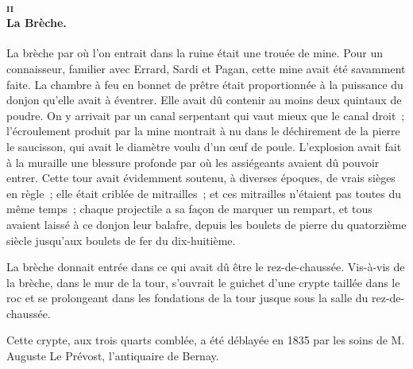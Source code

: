 \documentclass[french,twoside]{book} %
\begin{document}
\paragraph[{ii La Brèche.}]{\textsc{ii} \\
La Brèche.}
\label{p3l2c9p2}
\noindent La brèche par où l’on entrait dans la ruine était une trouée de mine. Pour un connaisseur, familier avec Errard, Sardi et Pagan, cette mine avait été savamment faite. La chambre à feu en bonnet de prêtre était proportionnée à la puissance du donjon qu’elle avait à éventrer. Elle avait dû contenir au moins deux quintaux de poudre. On y arrivait par un canal serpentant qui vaut mieux que le canal droit ; l’écroulement produit par la mine montrait à nu dans le déchirement de la pierre le saucisson, qui avait le diamètre voulu d’un œuf de poule. L’explosion avait fait à la muraille une blessure profonde par où les assiégeants avaient dû pouvoir entrer. Cette tour avait évidemment soutenu, à diverses époques, de vrais sièges en règle ; elle était criblée de mitrailles ; et ces mitrailles n’étaient pas toutes du même temps ; chaque projectile a sa façon de marquer un rempart, et tous avaient laissé à ce donjon leur balafre, depuis les boulets de pierre du quatorzième siècle jusqu’aux boulets de fer du dix-huitième.\par
 La brèche donnait entrée dans ce qui avait dû être le rez-de-chaussée. Vis-à-vis de la brèche, dans le mur de la tour, s’ouvrait le guichet d’une crypte taillée dans le roc et se prolongeant dans les fondations de la tour jusque sous la salle du rez-de-chaussée.\par
Cette crypte, aux trois quarts comblée, a été déblayée en 1835 par les soins de M. Auguste Le Prévost, l’antiquaire de Bernay.
\end{document}
